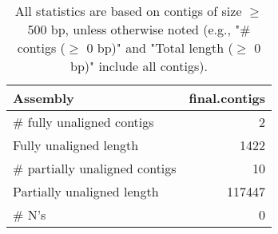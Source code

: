 \documentclass[12pt,a4paper]{article}
\begin{document}
\begin{table}[ht]
\begin{center}
\caption{All statistics are based on contigs of size $\geq$ 500 bp, unless otherwise noted (e.g., "\# contigs ($\geq$ 0 bp)" and "Total length ($\geq$ 0 bp)" include all contigs).}
\begin{tabular}{|l*{1}{|r}|}
\hline
Assembly & final.contigs \\ \hline
\# fully unaligned contigs & 2 \\ \hline
Fully unaligned length & 1422 \\ \hline
\# partially unaligned contigs & 10 \\ \hline
Partially unaligned length & 117447 \\ \hline
\# N's & 0 \\ \hline
\end{tabular}
\end{center}
\end{table}
\end{document}

